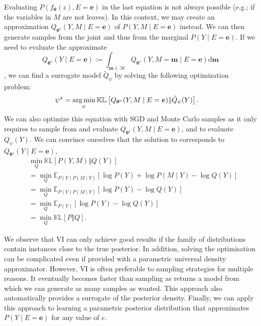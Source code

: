 Evaluating $P(f_{\bm{\theta}}(z), E=\bm{e})$ in the last equation is not always possible (e.g.; if the variables in $M$ are not leaves). In this context, we may create an approximation $Q_{\bm{\theta}^\star}(Y, M\mid E=\bm{e})$ of $P(Y, M\mid E=\bm{e})$ instead. We can then generate samples from the joint and thus from the marginal $P(Y\mid E=\bm{e})$. If we need to evaluate the approximate
$$Q_{\bm{\theta}^\star}(Y\mid E=\bm{e}) := \int_{\bm{m} \in \mathcal{M}} Q_{\bm{\theta}^\star}(Y, M=\bm{m}\mid E=\bm{e}) \text{d}\bm{m}$$, we can find a surrogate model $\tilde Q_\psi$ by solving the following optimization problem:
\begin{align}
  \psi^\star &= \operatorname*{arg\,min}_\psi \mathbb{KL}\left[Q_{\bm{\theta}^\star}(Y, M\mid E=\bm{e})\Vert \tilde Q_\psi(Y) \right]. \label{eq:approx_posterior}
\end{align}
We can also optimize this equation with SGD and Monte Carlo samples as it only requires to sample from and evaluate $Q_{\bm{\theta}^\star}(Y, M\mid E=\bm{e})$, and to evaluate $Q_\psi(Y)$. We can convince ourselves that the solution to  corresponds to $Q_{\bm{\theta}^\star}(Y\mid E=\bm{e})$,
\begin{align}
  &\min_Q \mathbb{KL}\left[P(Y, M)\Vert Q(Y) \right]\\
  &=\min_Q \mathbb{E}_{P(Y) P(M\mid Y)}\left[\log P(Y) + \log P(M\mid Y) - \log Q(Y)\right]\\
  &=\min_Q \mathbb{E}_{P(Y) P(M\mid Y)}\left[\log P(Y) - \log Q(Y)\right]\\
  &= \min_Q \mathbb{E}_{P(Y)}\left[\log P(Y) - \log Q(Y)\right]\\
  &= \min_Q \mathbb{KL}\left[P\Vert Q \right].
\end{align}

We observe that VI can only achieve good results if the family of distributions contain instances close to the true posterior. In addition, solving the optimisation can be complicated even if provided with a parametric universal density approximator. However, VI is often preferable to sampling strategies for multiple reasons. It eventually becomes faster than sampling as  returns a model from which we can generate as many samples as wanted. This approach also automatically provides a surrogate of the posterior density. Finally, we can apply this approach to learning a parametric posterior distribution that approximates $P(Y\mid E=\bm{e})$ for any value of $e$.

